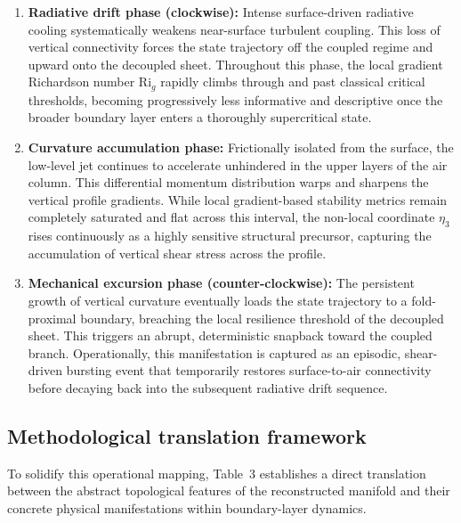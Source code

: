 \documentclass[12pt,a4paper]{article}
\newcommand{\Rig}{\mathrm{Ri}_g}
\begin{document}
\begin{enumerate}
  \item \textbf{Radiative drift phase (clockwise):} Intense surface-driven radiative cooling systematically weakens near-surface turbulent coupling. This loss of vertical connectivity forces the state trajectory off the coupled regime and upward onto the decoupled sheet. Throughout this phase, the local gradient Richardson number $\Rig$ rapidly climbs through and past classical critical thresholds, becoming progressively less informative and descriptive once the broader boundary layer enters a thoroughly supercritical state.
  \item \textbf{Curvature accumulation phase:} Frictionally isolated from the surface, the low-level jet continues to accelerate unhindered in the upper layers of the air column. This differential momentum distribution warps and sharpens the vertical profile gradients. While local gradient-based stability metrics remain completely saturated and flat across this interval, the non-local coordinate $\eta_3$ rises continuously as a highly sensitive structural precursor, capturing the accumulation of vertical shear stress across the profile.
  \item \textbf{Mechanical excursion phase (counter-clockwise):} The persistent growth of vertical curvature eventually loads the state trajectory to a fold-proximal boundary, breaching the local resilience threshold of the decoupled sheet. This triggers an abrupt, deterministic snapback toward the coupled branch. Operationally, this manifestation is captured as an episodic, shear-driven bursting event that temporarily restores surface-to-air connectivity before decaying back into the subsequent radiative drift sequence.
\end{enumerate}

\subsection{Methodological translation framework}

To solidify this operational mapping, Table~3 establishes a direct translation between the abstract topological features of the reconstructed manifold and their concrete physical manifestations within boundary-layer dynamics.
\end{document}
